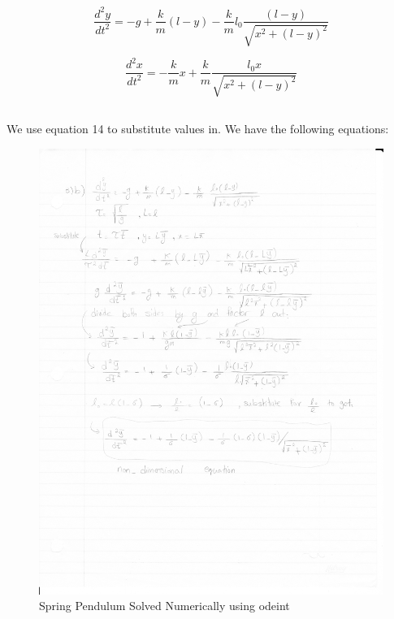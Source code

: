 \documentclass[letterpaper,12pt]{article}
\begin{document}
\begin{equation}
\frac{d^2y}{dt^2} = -g + \frac{k}{m}(l-y) - \frac{k}{m} l_{0}\frac{(l-y)}{\sqrt{x^2 + (l-y)^2}}
\end{equation}

\begin{equation}
\frac{d^2x}{dt^2} =- \frac{k}{m}x + \frac{k}{m}\frac{l_{0}x}{\sqrt{x^2 + (l-y)^2}}
\end{equation}

\subsection{}
We use equation 14 to substitute values in. We have the following equations:

\FloatBarrier
\begin{figure}[h!]
\centering
\includegraphics[scale=0.6]{3_b_1.pdf}
\caption{Spring Pendulum Solved Numerically using odeint}

\end{figure}
\FloatBarrier
\end{document}
